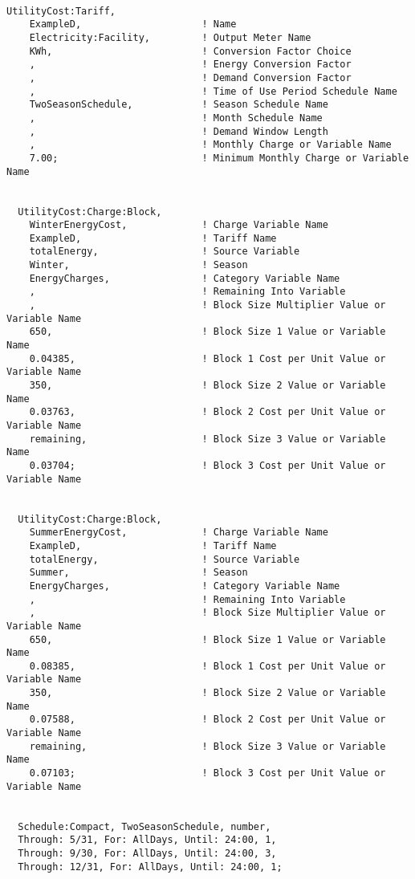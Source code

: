 \begin{lstlisting}

UtilityCost:Tariff,
    ExampleD,                     ! Name
    Electricity:Facility,         ! Output Meter Name
    KWh,                          ! Conversion Factor Choice
    ,                             ! Energy Conversion Factor
    ,                             ! Demand Conversion Factor
    ,                             ! Time of Use Period Schedule Name
    TwoSeasonSchedule,            ! Season Schedule Name
    ,                             ! Month Schedule Name
    ,                             ! Demand Window Length
    ,                             ! Monthly Charge or Variable Name
    7.00;                         ! Minimum Monthly Charge or Variable Name


  UtilityCost:Charge:Block,
    WinterEnergyCost,             ! Charge Variable Name
    ExampleD,                     ! Tariff Name
    totalEnergy,                  ! Source Variable
    Winter,                       ! Season
    EnergyCharges,                ! Category Variable Name
    ,                             ! Remaining Into Variable
    ,                             ! Block Size Multiplier Value or Variable Name
    650,                          ! Block Size 1 Value or Variable Name
    0.04385,                      ! Block 1 Cost per Unit Value or Variable Name
    350,                          ! Block Size 2 Value or Variable Name
    0.03763,                      ! Block 2 Cost per Unit Value or Variable Name
    remaining,                    ! Block Size 3 Value or Variable Name
    0.03704;                      ! Block 3 Cost per Unit Value or Variable Name


  UtilityCost:Charge:Block,
    SummerEnergyCost,             ! Charge Variable Name
    ExampleD,                     ! Tariff Name
    totalEnergy,                  ! Source Variable
    Summer,                       ! Season
    EnergyCharges,                ! Category Variable Name
    ,                             ! Remaining Into Variable
    ,                             ! Block Size Multiplier Value or Variable Name
    650,                          ! Block Size 1 Value or Variable Name
    0.08385,                      ! Block 1 Cost per Unit Value or Variable Name
    350,                          ! Block Size 2 Value or Variable Name
    0.07588,                      ! Block 2 Cost per Unit Value or Variable Name
    remaining,                    ! Block Size 3 Value or Variable Name
    0.07103;                      ! Block 3 Cost per Unit Value or Variable Name


  Schedule:Compact, TwoSeasonSchedule, number,
  Through: 5/31, For: AllDays, Until: 24:00, 1,
  Through: 9/30, For: AllDays, Until: 24:00, 3,
  Through: 12/31, For: AllDays, Until: 24:00, 1;
\end{lstlisting}

